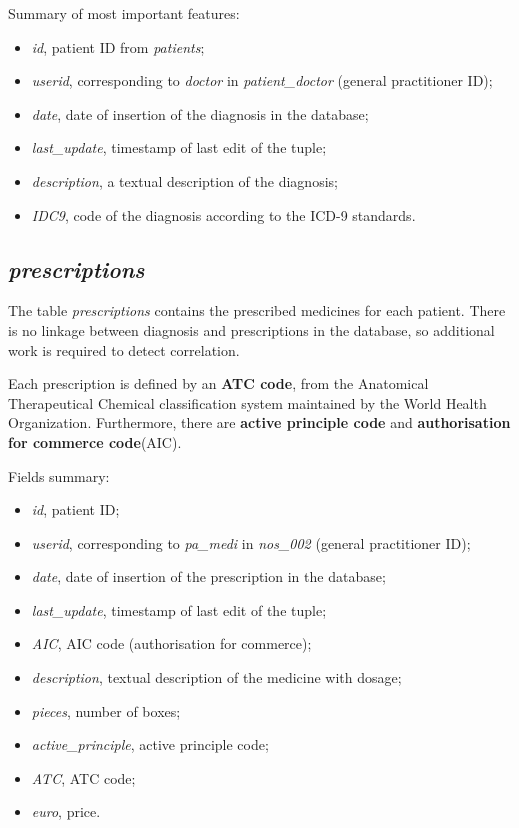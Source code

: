 Summary of most important features:
\begin{itemize}
	\item \textit{id}, patient ID from \textit{patients};
	\item \textit{userid}, corresponding to \textit{doctor} in \textit{patient\_doctor} (general practitioner ID);
	\item \textit{date}, date of insertion of the diagnosis in the database;
	\item \textit{last\_update}, timestamp of last edit of the tuple;
	\item \textit{description}, a textual description of the diagnosis;
	\item \textit{IDC9}, code of the diagnosis according to the ICD-9 standards.
\end{itemize}

\subsection{\textit{prescriptions}}
The table \textit{prescriptions} contains the prescribed medicines for each patient. There is no linkage between diagnosis and prescriptions in the database, so additional work is required to detect correlation.

Each prescription is defined by an \textbf{ATC code}, from the Anatomical Therapeutical Chemical classification system maintained by the World Health Organization. Furthermore, there are \textbf{active principle code} and \textbf{authorisation for commerce code}(AIC).

Fields summary:
\begin{itemize}
	\item \textit{id}, patient ID;
	\item \textit{userid}, corresponding to \textit{pa\_medi }in \textit{nos\_002} (general practitioner ID);
	\item \textit{date}, date of insertion of the prescription in the database;
	\item \textit{last\_update}, timestamp of last edit of the tuple;
	\item \textit{AIC}, AIC code (authorisation for commerce);
	\item \textit{description}, textual description of the medicine with dosage;
	\item \textit{pieces}, number of boxes;
	\item \textit{active\_principle}, active principle code;
	\item \textit{ATC}, ATC code;
	\item \textit{euro}, price.
\end{itemize}

